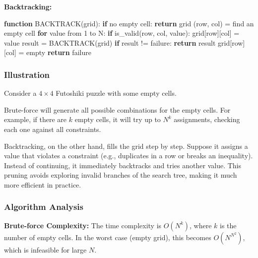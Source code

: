 \textbf{Backtracking:}
\begin{algorithm}[H]
\caption{Backtracking}
\begin{algorithmic}[1]
\State \textbf{function} BACKTRACK(grid):
\State \hspace{1.5em} \textbf{if} no empty cell:
\State \hspace{3em} \textbf{return} grid
\State
\State \hspace{1.5em} (row, col) = find an empty cell
\State
\State \hspace{1.5em} \textbf{for} value from 1 to N:
\State \hspace{3em} \textbf{if} is\_valid(row, col, value):
\State \hspace{4.5em} grid[row][col] = value
\State
\State \hspace{4.5em} result = BACKTRACK(grid)
\State \hspace{4.5em} \textbf{if} result != failure:
\State \hspace{6em} \textbf{return} result
\State
\State \hspace{4.5em} grid[row][col] = empty
\State
\State \hspace{1.5em} \textbf{return} failure
\end{algorithmic}
\end{algorithm}

\subsubsection{Illustration}
Consider a $4 \times 4$ Futoshiki puzzle with some empty cells. 

Brute-force will generate all possible combinations for the empty cells. For example, if there are $k$ empty cells, it will try up to $N^k$ assignments, checking each one against all constraints.

Backtracking, on the other hand, fills the grid step by step. Suppose it assigns a value that violates a constraint (e.g., duplicates in a row or breaks an inequality). Instead of continuing, it immediately backtracks and tries another value. This pruning avoids exploring invalid branches of the search tree, making it much more efficient in practice.

\subsubsection{Algorithm Analysis}
\textbf{Brute-force Complexity:}
The time complexity is $O(N^k)$, where $k$ is the number of empty cells. In the worst case (empty grid), this becomes $O(N^{N^2})$, which is infeasible for large $N$.

